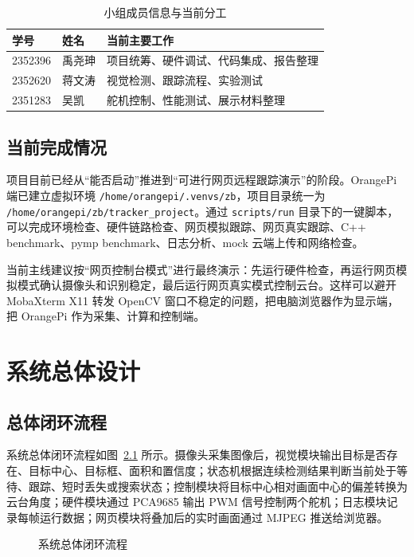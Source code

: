 \documentclass[
  oneside,
  degree=bachelor,
  field=science,
  fullwidthstop=circle,
  fontset=windows,
  times=false,
  minted=false,
  biblatex=false,
  algo=algpseudocode,
]{tongjithesis}
\newcommand{\code}[1]{\texttt{#1}}
\begin{document}
\begin{table}[htbp]
  \centering
  \caption{小组成员信息与当前分工}
  \label{tab:members}
  \begin{tabular}{lll}
    \toprule
    学号 & 姓名 & 当前主要工作 \\
    \midrule
    2352396 & 禹尧珅 & 项目统筹、硬件调试、代码集成、报告整理 \\
    2352620 & 蒋文涛 & 视觉检测、跟踪流程、实验测试 \\
    2351283 & 吴凯 & 舵机控制、性能测试、展示材料整理 \\
    \bottomrule
  \end{tabular}
\end{table}

\section{当前完成情况}

项目目前已经从“能否启动”推进到“可进行网页远程跟踪演示”的阶段。OrangePi 端已建立虚拟环境 \code{/home/orangepi/.venvs/zb}，项目目录统一为 \code{/home/orangepi/zb/tracker\_project}。通过 \code{scripts/run} 目录下的一键脚本，可以完成环境检查、硬件链路检查、网页模拟跟踪、网页真实跟踪、C++ benchmark、pymp benchmark、日志分析、mock 云端上传和网络检查。

当前主线建议按“网页控制台模式”进行最终演示：先运行硬件检查，再运行网页模拟模式确认摄像头和识别稳定，最后运行网页真实模式控制云台。这样可以避开 MobaXterm X11 转发 OpenCV 窗口不稳定的问题，把电脑浏览器作为显示端，把 OrangePi 作为采集、计算和控制端。

\chapter{系统总体设计}

\section{总体闭环流程}

系统总体闭环流程如图~\ref{fig:system-flow} 所示。摄像头采集图像后，视觉模块输出目标是否存在、目标中心、目标框、面积和置信度；状态机根据连续检测结果判断当前处于等待、跟踪、短时丢失或搜索状态；控制模块将目标中心相对画面中心的偏差转换为云台角度；硬件模块通过 PCA9685 输出 PWM 信号控制两个舵机；日志模块记录每帧运行数据；网页模块将叠加后的实时画面通过 MJPEG 推送给浏览器。

\begin{figure}[htbp]
  \centering
  \caption{系统总体闭环流程}
  \label{fig:system-flow}
\end{figure}
\end{document}
